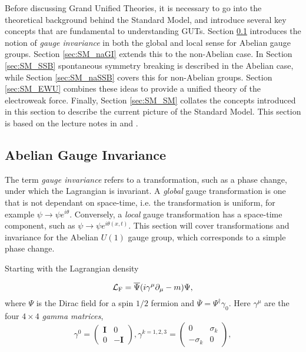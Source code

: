 \documentclass{article}
\begin{document}
Before discussing Grand Unified Theories, it is necessary to go into the theoretical background behind the Standard Model, and introduce several key concepts that are fundamental to understanding GUTs. Section \ref{sec:SM_aGI} introduces the notion of \textit{gauge invariance} in both the global and local sense for Abelian gauge groups. Section \ref{sec:SM_naGI} extends this to the non-Abelian case. In Section \ref{sec:SM_SSB} spontaneous symmetry breaking is described in the Abelian case, while Section \ref{sec:SM_naSSB} covers this for non-Abelian groups. Section \ref{sec:SM_EWU} combines these ideas to provide a unified theory of the electroweak force. Finally, Section \ref{sec:SM_SM} collates the concepts introduced in this section to describe the current picture of the Standard Model.
This section is based on the lecture notes in \cite{LecNotes1} and \cite{LecNotes2}.
\subsection{Abelian Gauge Invariance}%
\label{sec:SM_aGI}
The term \textit{gauge invariance} refers to a transformation, such as a phase change, under which the Lagrangian is invariant. A \textit{global} gauge transformation is one that is not dependant on space-time, i.e. the transformation is uniform, for example $\psi\rightarrow\psi e^{i\theta}$. Conversely, a \textit{local} gauge transformation has a space-time component, such as $\psi\rightarrow\psi e^{i\theta(x,t)}$. This section will cover transformations and invariance for the Abelian $U(1)$ gauge group, which corresponds to a simple phase change.

Starting with the Lagrangian density

\begin{equation}
\label{eqn:abelianLagrangian}
    \mathcal{L_{\rm{F}}} = \overline{\Psi} (i\gamma^\mu \partial_\mu - m)\Psi,
\end{equation}
where $\Psi$ is the Dirac field for a spin $1/2$ fermion and $\overline{\Psi} = \Psi^{\dagger}\gamma_{0}$. Here $\gamma^\mu$ are the four $4\times4$ \textit{gamma matrices},
\begin{equation}
\gamma^0 = \left(\begin{matrix}\bm{I}&0\\0&-\bm{I}\end{matrix}\right),\gamma^{k=1,2,3} = \left(\begin{matrix} 0 & \sigma_k \\ -\sigma_k & 0 \end{matrix}\right),
\end{equation}
\end{document}
